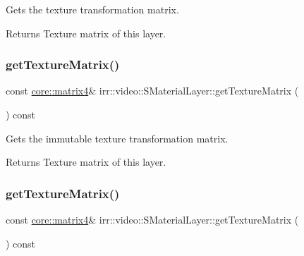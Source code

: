 Gets the texture transformation matrix. 

\begin{DoxyReturn}{Returns}
Texture matrix of this layer. 
\end{DoxyReturn}
\mbox{\label{classirr_1_1video_1_1SMaterialLayer_a81072348510d63fcc11134ae7471c5f7}} 
\subsubsection{\texorpdfstring{get\+Texture\+Matrix()}{getTextureMatrix()}\hspace{0.1cm}{\footnotesize\ttfamily [3/4]}}
{\footnotesize\ttfamily const \hyperlink{namespaceirr_1_1core_a4c9d4e29899535971052810954a14431}{core\+::matrix4}\& irr\+::video\+::\+S\+Material\+Layer\+::get\+Texture\+Matrix (\begin{DoxyParamCaption}{ }\end{DoxyParamCaption}) const\hspace{0.3cm}{\ttfamily [inline]}}



Gets the immutable texture transformation matrix. 

\begin{DoxyReturn}{Returns}
Texture matrix of this layer. 
\end{DoxyReturn}
\mbox{\label{classirr_1_1video_1_1SMaterialLayer_a81072348510d63fcc11134ae7471c5f7}} 
\subsubsection{\texorpdfstring{get\+Texture\+Matrix()}{getTextureMatrix()}\hspace{0.1cm}{\footnotesize\ttfamily [4/4]}}
{\footnotesize\ttfamily const \hyperlink{namespaceirr_1_1core_a4c9d4e29899535971052810954a14431}{core\+::matrix4}\& irr\+::video\+::\+S\+Material\+Layer\+::get\+Texture\+Matrix (\begin{DoxyParamCaption}{ }\end{DoxyParamCaption}) const\hspace{0.3cm}{\ttfamily [inline]}}



